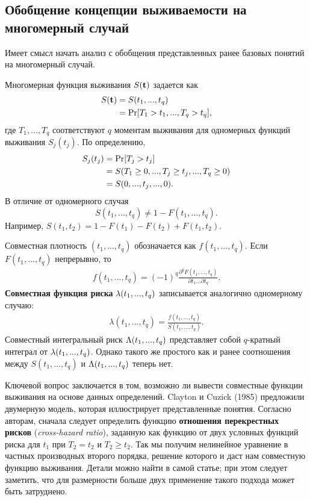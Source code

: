 \subsection{Обобщение концепции выживаемости на многомерный случай}\label{sec:19.3.1}

\noindent
Имеет смысл начать анализ с обобщения представленных ранее базовых понятий на многомерный случай.

Многомерная функция выживания $S(\bt)$ задается как
    \begin{align}\label{eq:19.13}
    S(\bt)    &= S(t_1,...,t_q) \\
            &= \Pr [T_1>t_1,...,T_q>t_q], \notag
    \end{align}
где $T_1, ..., T_q$ соответствуют $q$ моментам выживания для одномерных функций выживания $S_j(t_j)$. По определению,
    \begin{align}\label{eq:19.14}
    S_j(t_j)    &= \Pr [T_j>t_j] \\
                &= S(T_1 \ge 0,..., T_j \ge t_j, ..., T_q \ge 0) \notag \\
                &= S(0,...,t_j, ...,0). \notag
    \end{align}
В отличие от одномерного случая
    $$ S(t_1, ..., t_q) \ne 1-F(t_1, ..., t_q).$$
Например, $S(t_1,t_2) = 1-F(t_1)-F(t_2)+F(t_1,t_2)$.

Совместная плотность $(t_1, ..., t_q)$ обозначается как $f(t_1, ..., t_q)$. Если $F(t_1, ..., t_q)$ непрерывно, то
    \begin{align}\label{eq:19.15}
    f(t_1, ..., t_q) = (-1)^q \frac{\partial^q F(t_1,... , t_q)}{\partial t_1...\partial t_q}.
    \end{align}
\textbf{Совместная функция риска} $\la(t_1, ..., t_q)$ записывается аналогично одномерному случаю:
    \begin{align}\label{eq:19.16}
    \lambda(t_1, ..., t_q) = \frac{f(t_1, ..., t_q)}{S(t_1, ..., t_q)}.
    \end{align}
Совместный интегральный риск $\La(t_1, ..., t_q)$ представляет собой $q$-кратный интеграл от $\la(t_1, ..., t_q)$. Однако такого же простого как и ранее соотношения между $S(t_1, ..., t_q)$ и $\La(t_1, ..., t_q)$ теперь нет.

Ключевой вопрос заключается в том, возможно ли вывести совместные функции выживания на основе данных определений. Clayton и Cuzick (1985) предложили двумерную модель, которая иллюстрирует представленные понятия. Согласно авторам, сначала следует определить функцию \textbf{отношения перекрестных рисков} (\textit{cross-hazard ratio}), заданную как функцию от двух условных функций риска для $t_1$ при $T_2 = t_2$ и $T_2 \ge t_2$. Так мы получим нелинейное уравнение в частных производных второго порядка, решение которого и даст нам совместную функцию выживания. Детали можно найти в самой статье; при этом следует заметить, что для размерности больше двух применение такого подхода может быть затруднено.


